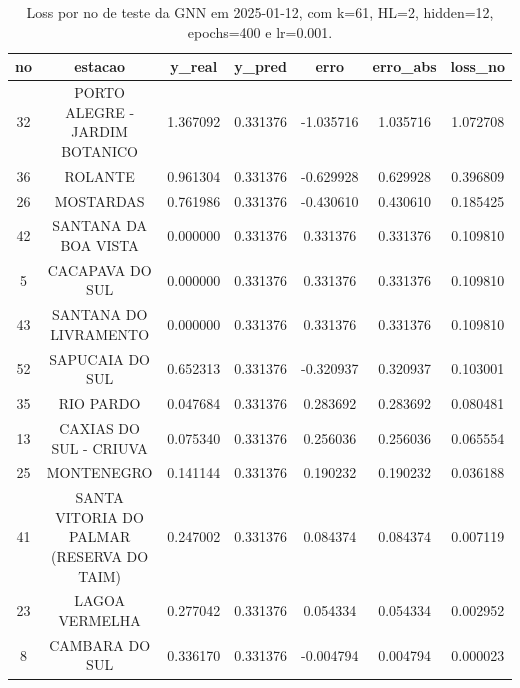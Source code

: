 \begin{table}[h]
\centering
\caption{Loss por no de teste da GNN em 2025-01-12, com k=61, HL=2, hidden=12, epochs=400 e lr=0.001.}
\label{tab:gnn_loss_k61_hl2_h12_e400_d20250112}
\begin{tabular}{ccccccc}
\toprule
no & estacao & y\_real & y\_pred & erro & erro\_abs & loss\_no \\
\midrule
32 & PORTO ALEGRE - JARDIM BOTANICO & 1.367092 & 0.331376 & -1.035716 & 1.035716 & 1.072708 \\
36 & ROLANTE & 0.961304 & 0.331376 & -0.629928 & 0.629928 & 0.396809 \\
26 & MOSTARDAS & 0.761986 & 0.331376 & -0.430610 & 0.430610 & 0.185425 \\
42 & SANTANA DA BOA VISTA & 0.000000 & 0.331376 & 0.331376 & 0.331376 & 0.109810 \\
5 & CACAPAVA DO SUL & 0.000000 & 0.331376 & 0.331376 & 0.331376 & 0.109810 \\
43 & SANTANA DO LIVRAMENTO & 0.000000 & 0.331376 & 0.331376 & 0.331376 & 0.109810 \\
52 & SAPUCAIA DO SUL & 0.652313 & 0.331376 & -0.320937 & 0.320937 & 0.103001 \\
35 & RIO PARDO & 0.047684 & 0.331376 & 0.283692 & 0.283692 & 0.080481 \\
13 & CAXIAS DO SUL - CRIUVA & 0.075340 & 0.331376 & 0.256036 & 0.256036 & 0.065554 \\
25 & MONTENEGRO & 0.141144 & 0.331376 & 0.190232 & 0.190232 & 0.036188 \\
41 & SANTA VITORIA DO PALMAR (RESERVA DO TAIM) & 0.247002 & 0.331376 & 0.084374 & 0.084374 & 0.007119 \\
23 & LAGOA VERMELHA & 0.277042 & 0.331376 & 0.054334 & 0.054334 & 0.002952 \\
8 & CAMBARA DO SUL & 0.336170 & 0.331376 & -0.004794 & 0.004794 & 0.000023 \\
\bottomrule
\end{tabular}
\end{table}

